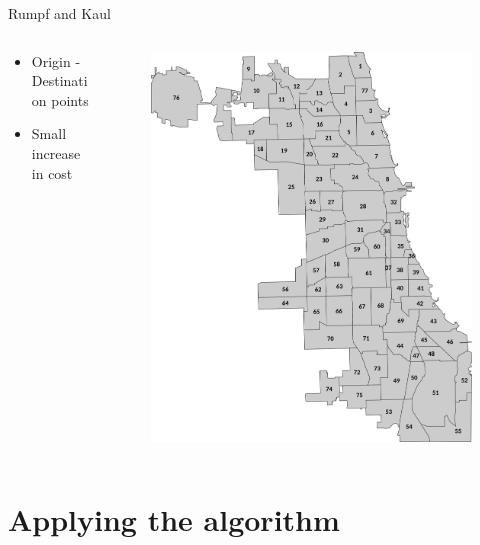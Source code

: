 \documentclass[9pt, aspectratio=43, english]{beamer}
\begin{document}
\begin{frame}{Rumpf and Kaul}
  \begin{columns}
    \begin{column}{0.48\textwidth}
      \begin{itemize}
        \item Origin - Destination points
        \item Small increase in cost
      \end{itemize}
    \end{column}
    \begin{column}{0.48\textwidth}
    \begin{figure}
      \centering
      \includegraphics[width=\textwidth]{Chicago_Community_Areas.png}
    \end{figure}
    \end{column}
  \end{columns}
\end{frame}
\section{Applying the algorithm}
\end{document}
